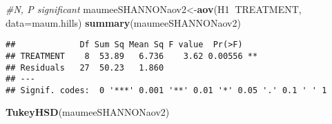 \documentclass[]{article}
\newenvironment{Shaded}{\begin{snugshade}}{\end{snugshade}}
\newcommand{\KeywordTok}[1]{\textcolor[rgb]{0.13,0.29,0.53}{\textbf{#1}}}
\newcommand{\DataTypeTok}[1]{\textcolor[rgb]{0.13,0.29,0.53}{#1}}
\newcommand{\CommentTok}[1]{\textcolor[rgb]{0.56,0.35,0.01}{\textit{#1}}}
\newcommand{\OperatorTok}[1]{\textcolor[rgb]{0.81,0.36,0.00}{\textbf{#1}}}
\newcommand{\NormalTok}[1]{#1}
\begin{document}
\begin{Shaded}
\begin{Highlighting}[]
\CommentTok{#N, P significant}
\NormalTok{maumeeSHANNONaov2<-}\KeywordTok{aov}\NormalTok{(H1}\OperatorTok{~}\NormalTok{TREATMENT, }\DataTypeTok{data=}\NormalTok{maum.hills)}
\KeywordTok{summary}\NormalTok{(maumeeSHANNONaov2)}
\end{Highlighting}
\end{Shaded}

\begin{verbatim}
##             Df Sum Sq Mean Sq F value  Pr(>F)   
## TREATMENT    8  53.89   6.736    3.62 0.00556 **
## Residuals   27  50.23   1.860                   
## ---
## Signif. codes:  0 '***' 0.001 '**' 0.01 '*' 0.05 '.' 0.1 ' ' 1
\end{verbatim}

\begin{Shaded}
\begin{Highlighting}[]
\KeywordTok{TukeyHSD}\NormalTok{(maumeeSHANNONaov2)}
\end{Highlighting}
\end{Shaded}
\end{document}
